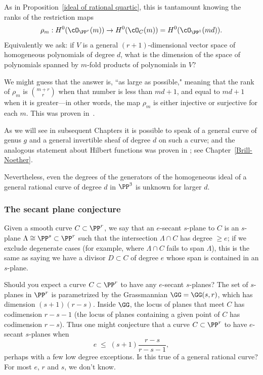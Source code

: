 As in Proposition~\ref{ideal of rational quartic}, this is tantamount knowing the ranks of the restriction maps
$$
\rho_m : H^0(\cO_{\PP^r}(m)) \to H^0(\cO_C(m)) = H^0(\cO_{\PP^1}(md)).
$$
Equivalently we ask: if $V$ is a general  $(r+1)$-dimensional vector space of homogeneous polynomials of degree $d$, what is the dimension of the space of polynomials spanned by $m$-fold products of polynomials in $V$? 

We might guess that the answer is, ``as large as possible," meaning that the rank of $\rho_m$ is $\binom{m+r}{r}$ when that number is less than $md+1$, and equal to $md+1$ when it is greater---in other words, the map $\rho_m$ is either injective or surjective for each $m$. This was proven in~\cite{Ballico-Ellia83}. 

As we will see in subsequent Chapters it is possible to speak of a general curve of genus $g$
and a general invertible sheaf of degree $d$ on such a curve; and the analogous statement 
about Hilbert functions  was proven in \cite{ELarson2018}; see Chapter~\ref{Brill-Noether}.

Nevertheless, even the degrees of the generators of the homogeneous ideal of a general
rational curve of degree $d$ in $\PP^3$ is unknown for larger $d$. 

\subsubsection{The secant plane conjecture}

Given a smooth curve $C \subset \PP^r$, we say that an $e$-secant $s$-plane to $C$ is an $s$-plane $\Lambda \cong \PP^s \subset \PP^r$ such that the intersection $\Lambda \cap C$ has degree $\geq e$; if we exclude degenerate cases (for example, where $\Lambda \cap C$ fails to span $\Lambda$), this is the same as saying we have a divisor $D \subset C$ of degree $e$ whose span is contained in an $s$-plane.

Should you expect a curve $C \subset \PP^r$ to have any $e$-secant $s$-planes? The set of $s$-planes in $\PP^r$ is parametrized by the Grassmannian $\GG = \GG(s,r)$, which has dimension $(s+1)(r-s)$. Inside $\GG$, the locus of planes that meet $C$ has codimension $r-s-1$ (the locus of planes containing a given point of $C$ has codimension $r-s$). Thus one might conjecture that a curve $C \subset \PP^r$ to have $e$-secant $s$-planes when 
$$
e \; \leq \; (s+1)\frac{r-s}{r-s-1},
$$
perhaps with a few low degree exceptions. Is this true of a general rational curve? For most $e$, $r$ and $s$, we don't know.

